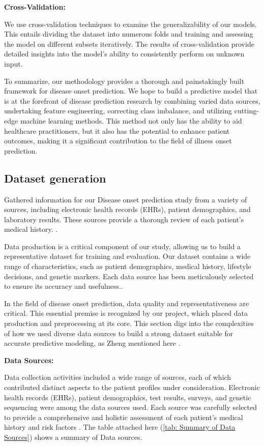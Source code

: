\documentclass[manuscript,screen,]{acmart}
\begin{document}
\textbf{Cross-Validation:}

    We use cross-validation techniques to examine the generalizability of our models. This entails dividing the dataset into numerous folds and training and assessing the model on different subsets iteratively. The results of cross-validation provide detailed insights into the model's ability to consistently perform on unknown input.

To summarize, our methodology provides a thorough and painstakingly built framework for disease onset prediction. We hope to build a predictive model that is at the forefront of disease prediction research by combining varied data sources, undertaking feature engineering, correcting class imbalance, and utilizing cutting-edge machine learning methods. This method not only has the ability to aid healthcare practitioners, but it also has the potential to enhance patient outcomes, making it a significant contribution to the field of illness onset prediction.

\subsection{Dataset generation}

Gathered information for our Disease onset prediction study from a variety of sources, including electronic health records (EHRs), patient demographics, and laboratory results. These sources provide a thorough review of each patient's medical history. \cite{johnson2016mimic}.

Data production is a critical component of our study, allowing us to build a representative dataset for training and evaluation. Our dataset contains a wide range of characteristics, such as patient demographics, medical history, lifestyle decisions, and genetic markers. Each data source has been meticulously selected to ensure its accuracy and usefulness.\cite{johnson2016mimic}.

In the field of disease onset prediction, data quality and representativeness are critical. This essential premise is recognized by our project, which placed data production and preprocessing at its core. This section digs into the complexities of how we used diverse data sources to build a strong dataset suitable for accurate predictive modeling, as Zheng mentioned here \cite{Zheng2022AccuratePredictions}.

\textbf{Data Sources:}
    
Data collection activities included a wide range of sources, each of which contributed distinct aspects to the patient profiles under consideration. Electronic health records (EHRs), patient demographics, test results, surveys, and genetic sequencing were among the data sources used. Each source was carefully selected to provide a comprehensive and holistic assessment of each patient's medical history and risk factors \cite{johnson2016mimic}. The table attached here (\ref{tab: Summary of Data Sources}) shows a summary of Data sources.
\end{document}
